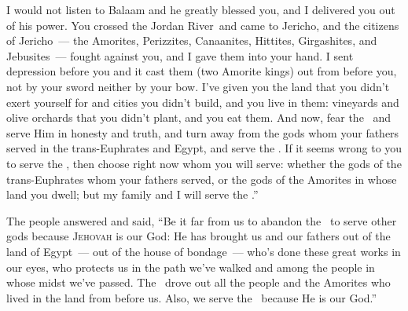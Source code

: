 \begin{inparaenum}
   I would not listen to Balaam and he greatly blessed you, and I delivered you out of his power.%
   You crossed the Jordan River\understood{}\ and came to Jericho, and the citizens of Jericho~--- the Amorites, Perizzites, Canaanites, Hittites, Girgashites, and Jebusites~--- fought against you, and I gave them into your hand.%
   I sent depression before you and it cast them (two Amorite kings) out from before you, not by your sword neither by your bow.%
   I've given you the land that you didn't exert yourself for and cities you didn't build, and you live in them: vineyards and olive orchards that you didn't plant, and you eat them.\understood{}%
   And now, fear the \lord\ and serve Him in honesty and truth, and turn away from the gods whom your fathers served in the trans-Euphrates and Egypt, and serve the \lord.%
   If it seems wrong to you to serve the \lord, then choose right now whom you will serve: whether the gods of the trans-Euphrates whom your fathers served, or the gods of the Amorites in whose land you dwell; but my family and I will serve the \lord.''%

   The people answered and said, ``Be it far from us to abandon the \lord\ to serve other gods%
   because \textsc{Jehovah} is our God: He has brought us and our fathers out of the land of Egypt~--- out of the house of bondage~--- who's done these great works in our eyes, who protects us in the path we've walked and among the people in whose midst we've passed.%
   The \lord\ drove out all the people and the Amorites who lived in the land from before us. Also, we serve the \lord\ because He is our God.''%


\end{inparaenum}
